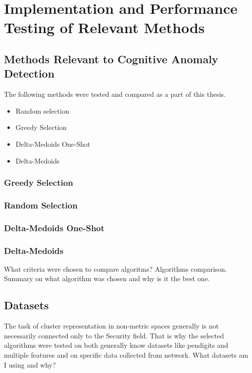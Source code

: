 \documentclass[thesis=B,english]{FITthesis}[2012/10/20]
\begin{document}

\chapter{Implementation and Performance Testing of Relevant Methods}

\section{Methods Relevant to Cognitive Anomaly Detection}
The following methods were tested and compared as a part of this thesis.
\begin{itemize}
    \item Random selection
    \item Greedy Selection
    \item Delta-Medoids One-Shot
    \item Delta-Medoids %
\end{itemize}

\subsection{Greedy Selection} %

\subsection{Random Selection}

\subsection{Delta-Medoids One-Shot}

\subsection{Delta-Medoids}

What criteria were chosen to compare algoritms?
Algorithms comparison.
Summary on what algorithm was chosen and why is it the best one.

\section{Datasets}
The task of cluster representation in non-metric spaces generally is not necessarily connected only to the Security field.
That is why the selected algorithms were tested on both generally know datasets like pendigits and multiple features and on specific data collected from network.
What datasets am I using and why?
\end{document}
